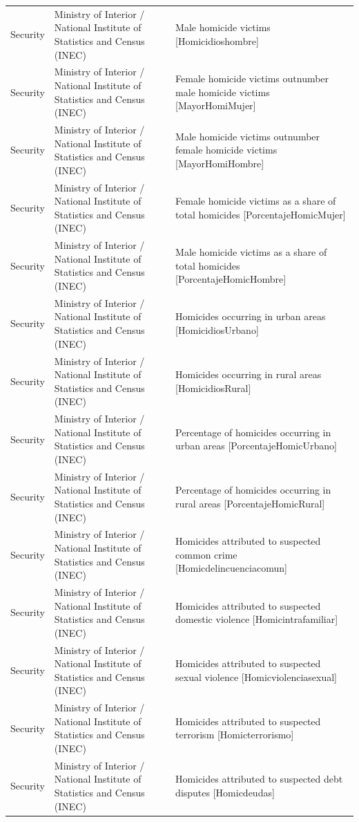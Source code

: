 \begin{landscape}
\begin{longtable}[t]{>{\raggedright\arraybackslash}p{3.4cm}>{\raggedright\arraybackslash}p{5.6cm}>{\raggedright\arraybackslash}p{12.4cm}}
Security & Ministry of Interior / National Institute of Statistics and Census (INEC) & Male homicide victims [Homicidioshombre]\\
Security & Ministry of Interior / National Institute of Statistics and Census (INEC) & Female homicide victims outnumber male homicide victims [MayorHomiMujer]\\
Security & Ministry of Interior / National Institute of Statistics and Census (INEC) & Male homicide victims outnumber female homicide victims [MayorHomiHombre]\\
Security & Ministry of Interior / National Institute of Statistics and Census (INEC) & Female homicide victims as a share of total homicides [PorcentajeHomicMujer]\\
Security & Ministry of Interior / National Institute of Statistics and Census (INEC) & Male homicide victims as a share of total homicides [PorcentajeHomicHombre]\\
Security & Ministry of Interior / National Institute of Statistics and Census (INEC) & Homicides occurring in urban areas [HomicidiosUrbano]\\
Security & Ministry of Interior / National Institute of Statistics and Census (INEC) & Homicides occurring in rural areas [HomicidiosRural]\\
Security & Ministry of Interior / National Institute of Statistics and Census (INEC) & Percentage of homicides occurring in urban areas [PorcentajeHomicUrbano]\\
Security & Ministry of Interior / National Institute of Statistics and Census (INEC) & Percentage of homicides occurring in rural areas [PorcentajeHomicRural]\\
Security & Ministry of Interior / National Institute of Statistics and Census (INEC) & Homicides attributed to suspected common crime [Homicdelincuenciacomun]\\
Security & Ministry of Interior / National Institute of Statistics and Census (INEC) & Homicides attributed to suspected domestic violence [Homicintrafamiliar]\\
Security & Ministry of Interior / National Institute of Statistics and Census (INEC) & Homicides attributed to suspected sexual violence [Homicviolenciasexual]\\
Security & Ministry of Interior / National Institute of Statistics and Census (INEC) & Homicides attributed to suspected terrorism [Homicterrorismo]\\
Security & Ministry of Interior / National Institute of Statistics and Census (INEC) & Homicides attributed to suspected debt disputes [Homicdeudas]\\

\end{longtable}
\end{landscape}
